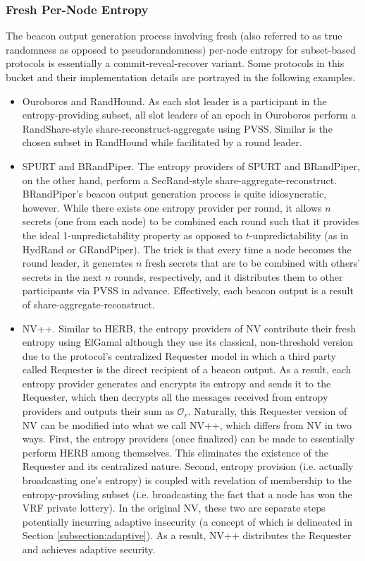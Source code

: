 \documentclass[letterpaper,twocolumn,10pt]{article}
\theoremstyle{definition}
\theoremstyle{remark}
\begin{document}
\subsubsection{Fresh Per-Node Entropy}
\label{subsubsection:fresh}
The beacon output generation process involving fresh (also referred to as true randomness \cite{cascudomt, das2021spurt} as opposed to pseudorandomness) per-node entropy for subset-based protocols is essentially a commit-reveal-recover variant. Some protocols in this bucket and their implementation details are portrayed in the following examples.
\begin{itemize}
\item Ouroboros and RandHound. As each slot leader is a participant in the entropy-providing subset, all slot leaders of an epoch in Ouroboros perform a RandShare-style share-reconstruct-aggregate using PVSS. Similar is the chosen subset in RandHound while facilitated by a round leader.
\item SPURT and BRandPiper. The entropy providers of SPURT and BRandPiper, on the other hand, perform a SecRand-style share-aggregate-reconstruct. BRandPiper's beacon output generation process is quite idiosyncratic, however. While there exists one entropy provider per round, it allows $n$ secrets (one from each node) to be combined each round such that it provides the ideal 1-unpredictability property as opposed to $t$-unpredictability (as in HydRand or GRandPiper). The trick is that every time a node becomes the round leader, it generates $n$ fresh secrets that are to be combined with others' secrets in the next $n$ rounds, respectively, and it distributes them to other participants via PVSS in advance. Effectively, each beacon output is a result of share-aggregate-reconstruct.
\item NV++. Similar to HERB, the entropy providers of NV \cite{nguyen2019scalable} contribute their fresh entropy using ElGamal although they use its classical, non-threshold version due to the protocol's centralized Requester model in which a third party called Requester is the direct recipient of a beacon output. As a result, each entropy provider generates and encrypts its entropy and sends it to the Requester, which then decrypts all the messages received from entropy providers and outputs their sum as $\mathcal{O}_r$. Naturally, this Requester version of NV can be modified into what we call NV++, which differs from NV in two ways. First, the entropy providers (once finalized) can be made to essentially perform HERB among themselves. This eliminates the existence of the Requester and its centralized nature. Second, entropy provision (i.e. actually broadcasting one's entropy) is coupled with revelation of membership to the entropy-providing subset (i.e. broadcasting the fact that a node has won the VRF private lottery). In the original NV, these two are separate steps potentially incurring adaptive insecurity (a concept of which is delineated in Section \ref{subsection:adaptive}). As a result, NV++ distributes the Requester and achieves adaptive security.
\end{itemize}
\end{document}
